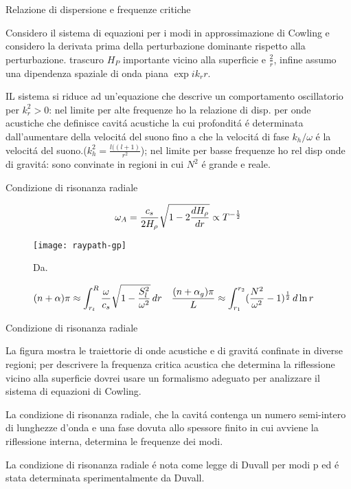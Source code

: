 \documentclass[10pt,xcolor={usenames},fleqn,mathserif,serif]{beamer}
\begin{document}
\begin{wordonframe}{Relazione di dispersione e frequenze critiche}

Considero il sistema di equazioni per i modi in approssimazione di Cowling e considero  la derivata prima della perturbazione dominante rispetto alla perturbazione.{\small
trascuro $H_P$ importante vicino alla superficie e $\frac{2}{r}$}, infine assumo una dipendenza spaziale di onda piana $\exp{ik_rr}$.

IL sistema si riduce ad un'equazione che descrive  un comportamento oscillatorio per $k_r^2>0$: nel limite per alte frequenze ho la relazione di disp. per onde acustiche che definisce cavit\'a acustiche la cui profondit\'a \'e determinata dall'aumentare della velocit\'a del suono fino a che la velocit\'a di fase $k_h/\omega$ \'e la velocit\'a del suono.($k_h^2=\frac{l((l+1)}{r^2}$); nel limite per basse frequenze ho rel disp onde di gravit\'a: sono convinate in regioni in cui $N^2$ \'e grande e reale.


\end{wordonframe}

\begin{frame}{Condizione di risonanza radiale}

\[\omega_A=\frac{c_s}{2H_{\rho}{}}\sqrt{1-2\frac{d H_{\rho}{}}{d r}}\propto T^{-\frac{1}{2}}
\]
\begin{figure}[!ht]
\centering
\texttt{[image: raypath-gp]}
\caption{Da\cite{gou91seismic}.}
\end{figure}

\begin{align*}
&(n+\alpha)\pi\approx\int_{r_t}^R\frac{\omega}{c_s}\sqrt{1-\frac{S_l^2}{\omega^2}}\,dr
\quad
\frac{(n+\alpha_g)\pi}{L}\approx\int_{r_1}^{r_2}(\frac{N^2}{\omega^2}-1)^{\frac{1}{2}}\,d\ln{r}
\end{align*}

\end{frame}

\begin{wordonframe}{Condizione di risonanza radiale}

La figura mostra le traiettorie di onde acustiche e di gravit\'a confinate in diverse regioni; per descrivere la frequenza critica acustica che determina la riflessione vicino alla superficie dovrei usare un formalismo adeguato per analizzare il sistema di equazioni di Cowling.

La condizione di risonanza radiale, che la cavit\'a contenga un numero semi-intero di lunghezze d'onda e una fase dovuta allo spessore finito in cui avviene la riflessione interna, determina le frequenze dei modi.

La condizione di risonanza radiale \'e nota come legge di Duvall per modi p ed \'e stata determinata sperimentalmente da Duvall.

\end{wordonframe}
\end{document}
